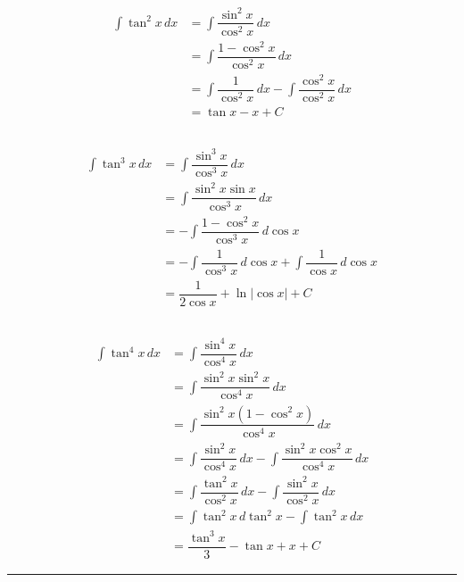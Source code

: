 \documentclass{scrartcl}
\begin{document}
\begin{align*}
\displaystyle \int \tan^2{x}\,dx
&= \int \dfrac{\sin^2{x}}{\cos^2{x}} \,dx\\
&= \int \dfrac{1-\cos^2{x}}{\cos^2{x}} \,dx\\
&= \int \dfrac{1}{\cos^2{x}} \,dx - \int \dfrac{\cos^2{x}}{\cos^2{x}} \,dx\\
&= \tan{x} - x + C
\end{align*}

\subsection{}

\begin{align*}
\displaystyle \int \tan^3{x}\,dx
&= \int \dfrac{\sin^3{x}}{\cos^3{x}} \,dx\\
&= \int \dfrac{\sin^2{x}\sin{x}}{\cos^3{x}} \,dx\\
&= -\int \dfrac{1-\cos^2{x}}{\cos^3{x}} \,d\cos{x}\\
&= -\int \dfrac{1}{\cos^3{x}} \,d\cos{x} + \int \dfrac{1}{\cos{x}} \,d\cos{x}\\
&= \dfrac{1}{2\cos{x}} + \ln{|\cos{x}|} + C
\end{align*}

\subsection{}

\begin{align*}
\displaystyle \int \tan^4{x}\,dx
&= \int \dfrac{\sin^4{x}}{\cos^4{x}} \,dx\\
&= \int \dfrac{\sin^2{x}\sin^2{x}}{\cos^4{x}} \,dx\\
&= \int \dfrac{\sin^2{x}(1-\cos^2{x})}{\cos^4{x}} \,dx\\
&= \int \dfrac{\sin^2{x}}{\cos^4{x}} \,dx - \int \dfrac{\sin^2{x}\cos^2{x}}{\cos^4{x}} \,dx\\
&= \int \dfrac{\tan^2{x}}{\cos^2{x}} \,dx - \int \dfrac{\sin^2{x}}{\cos^2{x}} \,dx\\
&= \int \tan^2{x} \,d\tan^2{x} - \int \tan^2{x} \,dx\\
&= \dfrac{\tan^3{x}}{3} - \tan{x} + x + C
\end{align*}

\hrule
\end{document}
